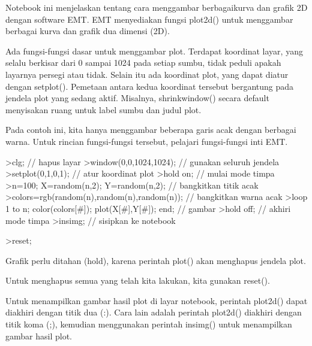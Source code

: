 \documentclass[a4paper,10pt]{article}
\begin{document}
\begin{eulernotebook}
\begin{eulercomment}
Notebook ini menjelaskan tentang cara menggambar berbagaikurva dan
grafik 2D dengan software EMT. EMT menyediakan fungsi plot2d() untuk
menggambar berbagai kurva dan grafik dua dimensi (2D).

\begin{eulercomment}
\begin{eulercomment}
\end{eulercomment}
\begin{eulercomment}
Ada fungsi-fungsi dasar untuk menggambar plot. Terdapat koordinat
layar, yang selalu berkisar dari 0 sampai 1024 pada setiap sumbu,
tidak peduli apakah layarnya persegi atau tidak. Selain itu ada
koordinat plot, yang dapat diatur dengan setplot(). Pemetaan antara
kedua koordinat tersebut bergantung pada jendela plot yang sedang
aktif. Misalnya, shrinkwindow() secara default menyisakan ruang untuk
label sumbu dan judul plot.

Pada contoh ini, kita hanya menggambar beberapa garis acak dengan
berbagai warna. Untuk rincian fungsi-fungsi tersebut, pelajari
fungsi-fungsi inti EMT.
\end{eulercomment}
\begin{eulerprompt}
>clg; // hapus layar
>window(0,0,1024,1024); // gunakan seluruh jendela
>setplot(0,1,0,1); // atur koordinat plot
>hold on; // mulai mode timpa
>n=100; X=random(n,2); Y=random(n,2);  // bangkitkan titik acak
>colors=rgb(random(n),random(n),random(n)); // bangkitkan warna acak
>loop 1 to n; color(colors[#]); plot(X[#],Y[#]); end; // gambar
>hold off; // akhiri mode timpa
>insimg; // sisipkan ke notebook
\end{eulerprompt}
\begin{eulerprompt}
>reset;
\end{eulerprompt}
\begin{eulercomment}
Grafik perlu ditahan (hold), karena perintah plot() akan menghapus jendela plot.

Untuk menghapus semua yang telah kita lakukan, kita gunakan reset().

Untuk menampilkan gambar hasil plot di layar notebook, perintah plot2d() dapat diakhiri
dengan titik dua (:). Cara lain adalah perintah plot2d() diakhiri dengan titik koma (;),
kemudian menggunakan perintah insimg() untuk menampilkan gambar hasil plot.


\end{eulercomment}
\end{eulercomment}
\end{eulercomment}
\end{eulernotebook}
\end{document}
